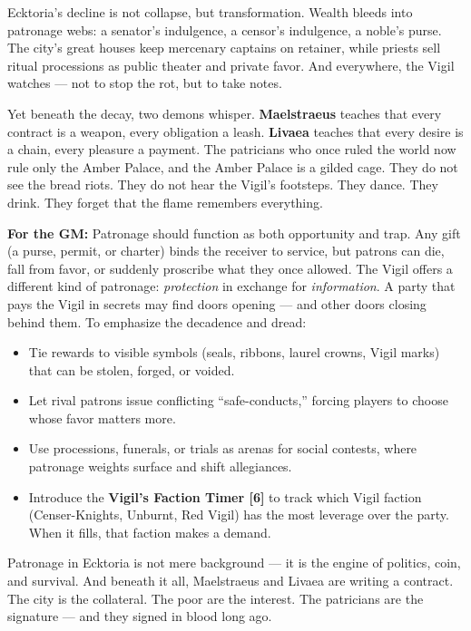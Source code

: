 \begin{tcolorbox}[colback=black!3,colframe=black!40!white,title={Patronage \& Power},breakable]
Ecktoria's decline is not collapse, but transformation. Wealth bleeds into patronage webs: a senator's indulgence, a censor's indulgence, a noble's purse. The city's great houses keep mercenary captains on retainer, while priests sell ritual processions as public theater and private favor. And everywhere, the Vigil watches --- not to stop the rot, but to take notes.

Yet beneath the decay, two demons whisper. \textbf{Maelstraeus} teaches that every contract is a weapon, every obligation a leash. \textbf{Livaea} teaches that every desire is a chain, every pleasure a payment. The patricians who once ruled the world now rule only the Amber Palace, and the Amber Palace is a gilded cage. They do not see the bread riots. They do not hear the Vigil's footsteps. They dance. They drink. They forget that the flame remembers everything.

\textbf{For the GM:}  
Patronage should function as both opportunity and trap. Any gift (a purse, permit, or charter) binds the receiver to service, but patrons can die, fall from favor, or suddenly proscribe what they once allowed. The Vigil offers a different kind of patronage: \emph{protection} in exchange for \emph{information}. A party that pays the Vigil in secrets may find doors opening --- and other doors closing behind them. To emphasize the decadence and dread:
\begin{itemize}
\item Tie rewards to visible symbols (seals, ribbons, laurel crowns, Vigil marks) that can be stolen, forged, or voided.
\item Let rival patrons issue conflicting ``safe-conducts,'' forcing players to choose whose favor matters more.
\item Use processions, funerals, or trials as arenas for social contests, where patronage weights surface and shift allegiances.
\item Introduce the \textbf{Vigil's Faction Timer [6]} to track which Vigil faction (Censer-Knights, Unburnt, Red Vigil) has the most leverage over the party. When it fills, that faction makes a demand.
\end{itemize}
Patronage in Ecktoria is not mere background --- it is the engine of politics, coin, and survival. And beneath it all, Maelstraeus and Livaea are writing a contract. The city is the collateral. The poor are the interest. The patricians are the signature --- and they signed in blood long ago.
\end{tcolorbox}

